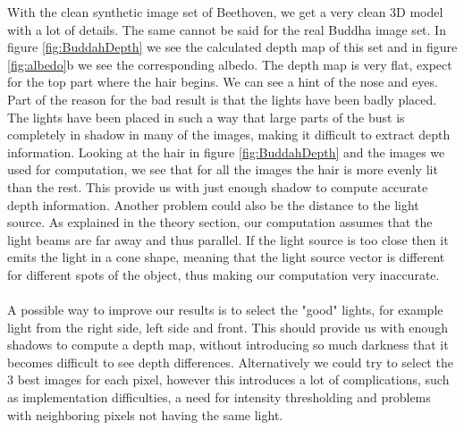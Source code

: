 \documentclass[12pt,a4paper,oneside,final]{article}
\begin{document}
With the clean synthetic image set of Beethoven, we get a very clean 3D model with a lot of details. The same cannot be said for the real Buddha image set. In figure \ref{fig:BuddahDepth} we see the calculated depth map of this set and in figure \ref{fig:albedo}b we see the corresponding albedo. The depth map is very flat, expect for the top part where the hair begins. We can see a hint of the nose and eyes. Part of the reason for the bad result is that the lights have been badly placed. The lights have been placed in such a way that large parts of the bust is completely in shadow in many of the images, making it difficult to extract depth information. Looking at the hair in figure \ref{fig:BuddahDepth} and the images we used for computation, we see that for all the images the hair is more evenly lit than the rest. This provide us with just enough shadow to compute accurate depth information. Another problem could also be the distance to the light source. As explained in the theory section, our computation assumes that the light beams are far away and thus parallel. If the light source is too close then it emits the light in a cone shape, meaning that the light source vector is different for different spots of the object, thus making our computation very inaccurate.
\\\\
A possible way to improve our results is to select the "good" lights, for example light from the right side, left side and front. This should provide us with enough shadows to compute a depth map, without introducing so much darkness that it becomes difficult to see depth differences. Alternatively we could try to select the 3 best images for each pixel, however this introduces a lot of complications, such as implementation difficulties, a need for intensity thresholding and problems with neighboring pixels not having the same light.
\end{document}
